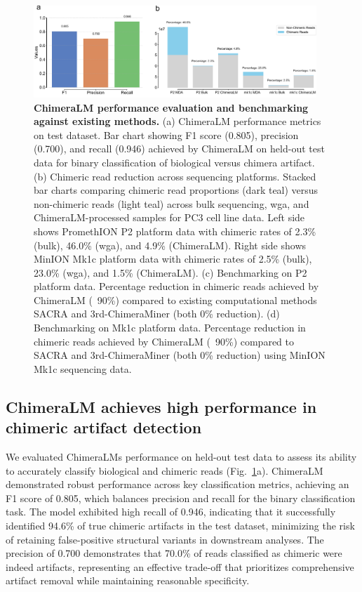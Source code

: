 \documentclass[pdflatex,sn-nature]{sn-jnl}%
\theoremstyle{thmstyleone}%
\theoremstyle{thmstyletwo}%
\theoremstyle{thmstylethree}%
\begin{document}
\begin{figure}[!ht]
	\begin{center}
		\includegraphics[width=0.95\textwidth]{final_figures/figure2}
	\end{center}
	\caption{{\bf ChimeraLM performance evaluation and benchmarking against existing methods.}
		(a) ChimeraLM performance metrics on test dataset. Bar chart showing F1 score (0.805), precision (0.700), and recall (0.946) achieved by ChimeraLM on held-out test data for binary classification of biological versus chimera artifact.
		(b) Chimeric read reduction across sequencing platforms. Stacked bar charts comparing chimeric read proportions (dark teal) versus non-chimeric reads (light teal) across bulk sequencing, \gls{wga}, and ChimeraLM-processed samples for PC3 cell line data. Left side shows PromethION P2 platform data with chimeric rates of 2.3\% (bulk), 46.0\% (\gls{wga}), and 4.9\% (ChimeraLM). Right side shows MinION Mk1c platform data with chimeric rates of 2.5\% (bulk), 23.0\% (\gls{wga}), and 1.5\% (ChimeraLM).
		(c) Benchmarking on P2 platform data. Percentage reduction in chimeric reads achieved by ChimeraLM (~90\%) compared to existing computational methods SACRA and 3rd-ChimeraMiner (both 0\% reduction).
		(d) Benchmarking on Mk1c platform data. Percentage reduction in chimeric reads achieved by ChimeraLM (~90\%) compared to SACRA and 3rd-ChimeraMiner (both 0\% reduction) using MinION Mk1c sequencing data.}\label{fig:figure2}
\end{figure}

\subsection*{ChimeraLM achieves high performance in chimeric artifact detection}

We evaluated ChimeraLM\textquotesingle s performance on held-out test data to assess its ability to accurately classify biological and chimeric reads (Fig.~\ref{fig:figure2}a).
ChimeraLM demonstrated robust performance across key classification metrics, achieving an F1 score of 0.805, which balances precision and recall for the binary classification task.
The model exhibited high recall of 0.946, indicating that it successfully identified 94.6\% of true chimeric artifacts in the test dataset, minimizing the risk of retaining false-positive structural variants in downstream analyses.
The precision of 0.700 demonstrates that 70.0\% of reads classified as chimeric were indeed artifacts, representing an effective trade-off that prioritizes comprehensive artifact removal while maintaining reasonable specificity.
\end{document}
